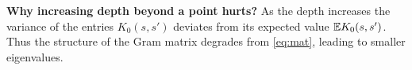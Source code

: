 \begin{appendix}
\textbf{Why increasing depth beyond a point hurts?} 
As the depth increases the variance of the entries $K_0(s,s')$ deviates from its expected value $\mathbb{E}{K_0(s,s')}$. Thus the structure of the Gram matrix degrades from \eqref{eq:mat}, leading to smaller eigenvalues.
\begin{figure}
\end{figure}
\end{appendix}
